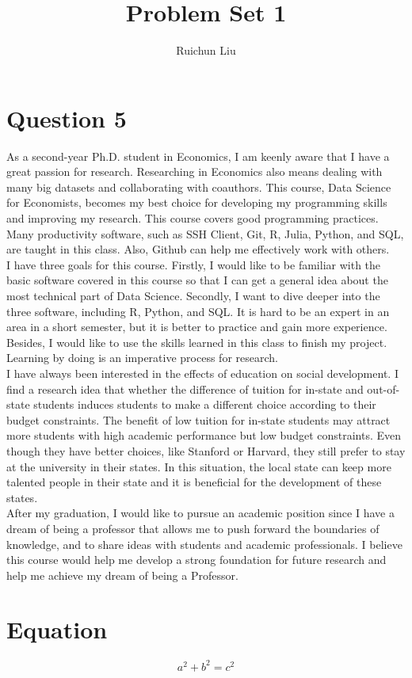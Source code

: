 \documentclass[11pt,a4paper]{article}
\title{Problem Set 1}
\author{Ruichun Liu}
\begin{document}
\maketitle

\section{Question 5}
As a second-year Ph.D. student in Economics, I am keenly aware that I have a great passion for research. Researching in Economics also means dealing with many big datasets and collaborating with coauthors. This course, Data Science for Economists, becomes my best choice for developing my programming skills and improving my research. This course covers good programming practices. Many productivity software, such as SSH Client, Git, R, Julia, Python, and SQL, are taught in this class. Also, Github can help me effectively work with others. \\
I have three goals for this course. Firstly, I would like to be familiar with the basic software covered in this course so that I can get a general idea about the most technical part of Data Science. Secondly, I want to dive deeper into the three software, including R, Python, and SQL. It is hard to be an expert in an area in a short semester, but it is better to practice and gain more experience. Besides, I would like to use the skills learned in this class to finish my project. Learning by doing is an imperative process for research.\\
I have always been interested in the effects of education on social development. I find a research idea that whether the difference of tuition for in-state and out-of-state students induces students to make a different choice according to their budget constraints. The benefit of low tuition for in-state students may attract more students with high academic performance but low budget constraints. Even though they have better choices, like Stanford or Harvard, they still prefer to stay at the university in their states. In this situation, the local state can keep more talented people in their state and it is beneficial for the development of these states.\\
After my graduation, I would like to pursue an academic position since I have a dream of being a professor that allows me to push forward the boundaries of knowledge, and to share ideas with students and academic professionals. I believe this course would help me develop a strong foundation for future research and help me achieve my dream of being a Professor. 

\section{Equation}
	\begin{equation}
	a^2+b^2 = c^2
	\end{equation}
\end{document}
